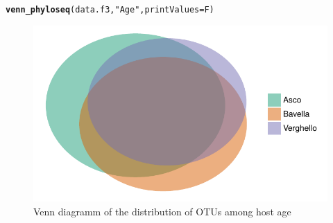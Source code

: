 \documentclass[12pt]{article}\usepackage[]{graphicx}\usepackage[]{color}
\makeatletter
\def\maxwidth{ %
  \ifdim\Gin@nat@width>\linewidth
    \linewidth
  \else
    \Gin@nat@width
  \fi
}
\newcommand{\hlstr}[1]{\textcolor[rgb]{0.192,0.494,0.8}{#1}}%
\newcommand{\hlstd}[1]{\textcolor[rgb]{0.345,0.345,0.345}{#1}}%
\newcommand{\hlkwc}[1]{\textcolor[rgb]{0.333,0.667,0.333}{#1}}%
\newcommand{\hlkwd}[1]{\textcolor[rgb]{0.737,0.353,0.396}{\textbf{#1}}}%
\newenvironment{kframe}{%
 \def\at@end@of@kframe{}%
 \ifinner\ifhmode%
  \def\at@end@of@kframe{\end{minipage}}%
  \begin{minipage}{\columnwidth}%
 \fi\fi%
 \def\FrameCommand##1{\hskip\@totalleftmargin \hskip-\fboxsep
 \colorbox{shadecolor}{##1}\hskip-\fboxsep
     \hskip-\linewidth \hskip-\@totalleftmargin \hskip\columnwidth}%
 \MakeFramed {\advance\hsize-\width
   \@totalleftmargin\z@ \linewidth\hsize
   \@setminipage}}%
 {\par\unskip\endMakeFramed%
 \at@end@of@kframe}
\newenvironment{knitrout}{}{} %
\numberwithin{figure}{section}
\makeatother
\begin{document}
\begin{knitrout}\small
{}\color{fgcolor}\begin{kframe}
\begin{alltt}
\hlkwd{venn_phyloseq}\hlstd{(data.f3,} \hlstr{"Age"}\hlstd{,} \hlkwc{printValues} \hlstd{= F)}
\end{alltt}
\end{kframe}\begin{figure}

{\centering \includegraphics[width=\maxwidth]{figure/unnamed-chunk-48-1} 

}

\caption[Venn diagramm of the distribution of OTUs among host age]{Venn diagramm of the distribution of OTUs among host age}\label{fig:unnamed-chunk-48}
\end{figure}


\end{knitrout}
\end{document}
